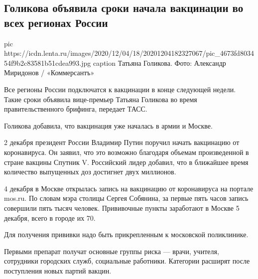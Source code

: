  
 
 
 
 
 
\subsection{Голикова объявила сроки начала вакцинации во всех регионах России}
\label{sec:04_12_2020.news.ru.lenta_ru.2.golikova_vaccination}


\ifcmt
pic https://icdn.lenta.ru/images/2020/12/04/18/20201204182327067/pic_4673fd803454f9b2c83581b51cdea993.jpg
caption Татьяна Голикова. Фото: Александр Миридонов / «Коммерсантъ»
\fi

Все регионы России подключатся к вакцинации в конце следующей недели. Такие
сроки объявила вице-премьер Татьяна Голикова во время правительственного
брифинга, передает ТАСС.

Голикова добавила, что вакцинация уже началась в армии и Москве.

2 декабря президент России Владимир Путин поручил начать вакцинацию от
коронавируса. Он заявил, что это возможно благодаря объемам произведенной в
стране вакцины Спутник V. Российский лидер добавил, что в ближайшее время
количество выпущенных доз достигнет двух миллионов.

4 декабря в Москве открылась запись на вакцинацию от коронавируса на портале
mos.ru. По словам мэра столицы Сергея Собянина, за первые пять часов запись
совершили пять тысяч человек. Прививочные пункты заработают в Москве 5 декабря,
всего в городе их 70.

Для получения прививки надо быть прикрепленным к московской поликлинике.

Первыми препарат получат основные группы риска — врачи, учителя, сотрудники
городских служб, социальные работники. Категории расширят после поступления
новых партий вакцин.
